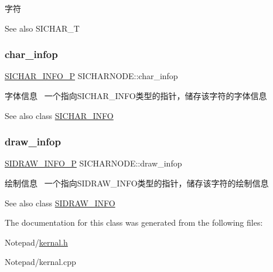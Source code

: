 字符 

\begin{DoxySeeAlso}{See also}
S\+I\+C\+H\+A\+R\+\_\+T 
\end{DoxySeeAlso}
\mbox{\label{class_s_i_c_h_a_r_n_o_d_e_a03e4b28edd8566a6b605f4caeeb7bd6f}} 
\subsubsection{\texorpdfstring{char\+\_\+infop}{char\_infop}}
{\footnotesize\ttfamily \hyperlink{class_s_i_c_h_a_r___i_n_f_o}{S\+I\+C\+H\+A\+R\+\_\+\+I\+N\+F\+O\+\_\+P} S\+I\+C\+H\+A\+R\+N\+O\+D\+E\+::char\+\_\+infop}



字体信息~\newline
一个指向\+S\+I\+C\+H\+A\+R\+\_\+\+I\+N\+F\+O类型的指针，储存该字符的字体信息 

\begin{DoxySeeAlso}{See also}
class \hyperlink{class_s_i_c_h_a_r___i_n_f_o}{S\+I\+C\+H\+A\+R\+\_\+\+I\+N\+FO} 
\end{DoxySeeAlso}
\mbox{\label{class_s_i_c_h_a_r_n_o_d_e_aee3adfece6b51d9f71a0aa19d203b106}} 
\subsubsection{\texorpdfstring{draw\+\_\+infop}{draw\_infop}}
{\footnotesize\ttfamily \hyperlink{class_s_i_d_r_a_w___i_n_f_o}{S\+I\+D\+R\+A\+W\+\_\+\+I\+N\+F\+O\+\_\+P} S\+I\+C\+H\+A\+R\+N\+O\+D\+E\+::draw\+\_\+infop}



绘制信息~\newline
一个指向\+S\+I\+D\+R\+A\+W\+\_\+\+I\+N\+F\+O类型的指针，储存该字符的绘制信息 

\begin{DoxySeeAlso}{See also}
class \hyperlink{class_s_i_d_r_a_w___i_n_f_o}{S\+I\+D\+R\+A\+W\+\_\+\+I\+N\+FO} 
\end{DoxySeeAlso}


The documentation for this class was generated from the following files\+:\begin{DoxyCompactItemize}
\item 
Notepad/\hyperlink{kernal_8h}{kernal.\+h}\item 
Notepad/kernal.\+cpp\end{DoxyCompactItemize}
